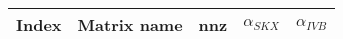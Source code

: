 \begin{tabular}{|l|l|S[round-mode=places,round-precision=2]|S[round-mode=places,round-precision=4]|S[round-mode=places,round-precision=4]|}
\toprule
{Index} & {Matrix name} &  {nnz} & {$\alpha_{SKX}$} & {$\alpha_{IVB}$}  \\
\midrule
\bottomrule
\end{tabular}


